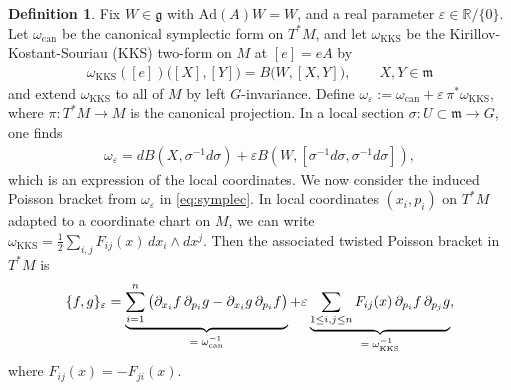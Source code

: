 \documentclass[11pt]{amsart}
\theoremstyle{definition}
\newtheorem{definition}[theorem]{Definition}
\theoremstyle{plain}
\theoremstyle{conclusion}
\begin{document}
\begin{definition}
\label{def:setup}
    Fix $W \in \mathfrak{g}$ with $\mathrm{Ad}(A)W=W$, and a real parameter $\varepsilon\in\mathbb{R}/\{0\}$. Let $\omega_{\mathrm{can}}$ be the canonical symplectic form on $T^*M$, and let $\omega_{\mathrm{KKS}}$ be the Kirillov-Kostant-Souriau (KKS) two-form on $M$ at $[e] = eA$ by \begin{align*}
  \omega_{\mathrm{KKS}}([e])\big([X],[Y]\big) = B\big(W,[X,Y]\big),\qquad X,Y\in\mathfrak{m}   
\end{align*} and extend $\omega_{\mathrm{KKS}}$ to all of $M$ by left $G$-invariance. Define $\omega_\varepsilon := \omega_{\mathrm{can}}+\varepsilon\,\pi^*\omega_{\mathrm{KKS}},$ where $\pi:T^*M\to M$ is the canonical projection. In a local section $\sigma: U \subset \mathfrak{m} \rightarrow G$, one finds \begin{align}
    \omega_{\varepsilon} =  dB(X,\sigma^{-1}d\sigma) +  \varepsilon B(W,[\sigma^{-1}d\sigma,\sigma^{-1}d\sigma]), \label{eq:symplec}
\end{align} which is an expression of the local coordinates. We now consider the induced Poisson bracket from $\omega_\varepsilon$ in \eqref{eq:symplec}. In local coordinates $(x_i,p_i)$ on $T^*M$ %
adapted to a coordinate chart on $M$, we can write  $\omega_{\mathrm{KKS}}=\frac{1}{2}\sum_{i,j}F_{ij}(x)\,dx_i\wedge dx^j$. Then the associated twisted Poisson bracket in $T^*M$ is \begin{align}
    \{f,g\}_\varepsilon =\underbrace{\sum_{i=1}^n\big(\partial_{x_i}f\,\partial_{p_i}g-\partial_{x_i}g\,\partial_{p_i}f\big)}_{\text{$ = \omega_{\mathrm{can}}^{-1}$}}+\varepsilon\underbrace{\sum_{1 \leq i,j \leq n}F_{ij}(x)\,\partial_{p_i}f\,\partial_{p_j}g}_{\text{$ = \omega_{\mathrm{KKS}}^{-1}$}}, \label{eq:mp1}
\end{align} where $F_{ij}(x) = -F_{ji}(x)$. 
\end{definition}
\end{document}
